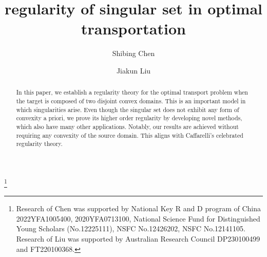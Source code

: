 \documentclass[11pt]{amsart}
\theoremstyle{plain}
\newcommand{\0}{\textbf{0}}
\numberwithin{equation}{section}
\numberwithin{equation}{section}
\numberwithin{figure}{section}
\begin{document}
\title[Regularity of singular set in optimal transportation]{\textbf{regularity of singular set in optimal transportation}}
 
\author[S. Chen]
{Shibing Chen}
\address [Shibing Chen]
{School of Mathematical Sciences,
University of Science and Technology of China,
Hefei, Anhui 230026, China}

\author[J. Liu]
{Jiakun Liu}
\address [Jiakun Liu]
	{School of Mathematics and Statistics,
	The University of Sydney,
	Camperdown, NSW 2006, Australia}



\thanks{Research of Chen was supported by National Key R and D program of China 2022YFA1005400,
 2020YFA0713100, National Science Fund for Distinguished Young Scholars
(No.12225111), NSFC No.12426202, NSFC No.12141105.
Research of Liu was supported by Australian Research Council DP230100499 and FT220100368. }



\date{}

 

\begin{abstract}  
In this paper, we establish a regularity theory for the optimal transport problem when the target is composed of two disjoint convex domains. This is an important model in which singularities arise.
Even though the singular set does not exhibit any form of convexity a priori, we  prove its higher order regularity by developing novel methods, which also have many other applications.
Notably, our results are achieved without requiring any convexity of the source domain. 
This aligns with Caffarelli's celebrated regularity theory.
\end{abstract}

\maketitle

\baselineskip=16.4pt
\parskip=3pt
\end{document}

